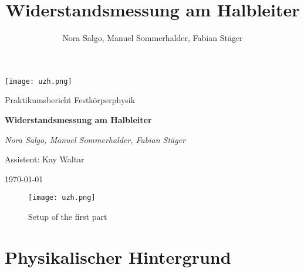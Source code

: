 \documentclass[a4paper]{scrartcl}
\title{Widerstandsmessung am Halbleiter}
\author{Nora Salgo, Manuel Sommerhalder, Fabian Stäger}
\begin{document}
\begin{titlepage}
	\centering
	\texttt{[image: uzh.png]}\par\vspace{1cm}
	\vspace{1cm}
	{\Large Praktikumsbericht Festkörperphysik\par}
	\vspace{1.5cm}
	{\huge\bfseries Widerstandsmessung am Halbleiter\par}
	\vspace{2cm}
	{\Large\itshape Nora Salgo, Manuel Sommerhalder, Fabian Stäger \par\vspace{1cm}
	Assistent: Kay Waltar}
	\vfill
	

	\vfill

	{\large \today\par}
\end{titlepage}


\begin{figure}[htbp]
\centering
\texttt{[image: uzh.png]}
\caption{Setup of the first part}
\label{setup1}
\end{figure}
%

\section{Physikalischer Hintergrund}
\end{document}
